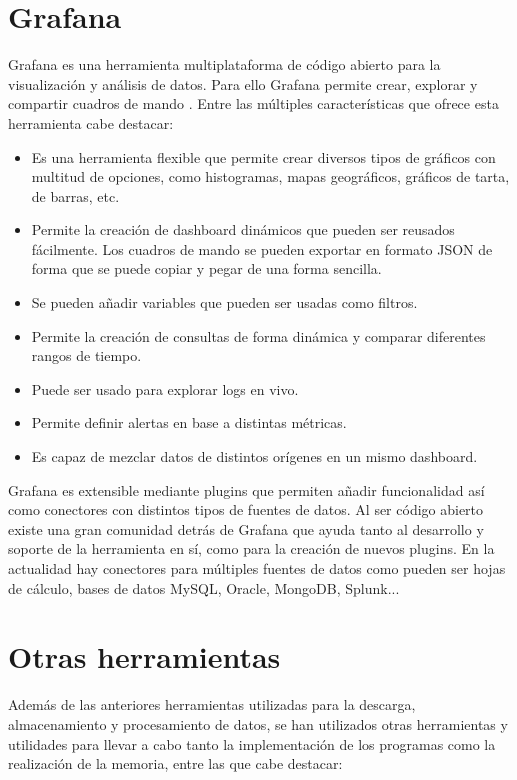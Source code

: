 \section{Grafana}

Grafana es una herramienta multiplataforma de código abierto para la visualización y análisis de datos. Para ello Grafana permite crear, explorar y compartir cuadros de mando \cite{wiki_grafana}\cite{github_grafana}. Entre las múltiples características que ofrece esta herramienta cabe destacar:

\begin{itemize}
    \item Es una herramienta flexible que permite crear diversos tipos de gráficos con multitud de opciones, como histogramas, mapas geográficos, gráficos de tarta, de barras, etc.
    \item Permite la creación de dashboard dinámicos que pueden ser reusados fácilmente. Los cuadros de mando se pueden exportar en formato JSON de forma que se puede copiar y pegar de una forma sencilla.
    \item Se pueden añadir variables que pueden ser usadas como filtros.
    \item Permite la creación de consultas de forma dinámica y comparar diferentes rangos de tiempo.
    \item Puede ser usado para explorar logs en vivo.
    \item Permite definir alertas en base a distintas métricas.
    \item Es capaz de mezclar datos de distintos orígenes en un mismo dashboard.
\end{itemize}

Grafana es extensible mediante plugins que permiten añadir funcionalidad así como conectores con distintos tipos de fuentes de datos. Al ser código abierto existe una gran comunidad detrás de Grafana que ayuda tanto al desarrollo y soporte de la herramienta en sí, como para la creación de nuevos plugins. En la actualidad hay conectores para múltiples fuentes de datos como pueden ser hojas de cálculo, bases de datos MySQL, Oracle, MongoDB, Splunk...

\section{Otras herramientas}

Además de las anteriores herramientas utilizadas para la descarga, almacenamiento y procesamiento de datos, se han utilizados otras herramientas y utilidades para llevar a cabo tanto la implementación de los programas como la realización de la memoria, entre las que cabe destacar:

